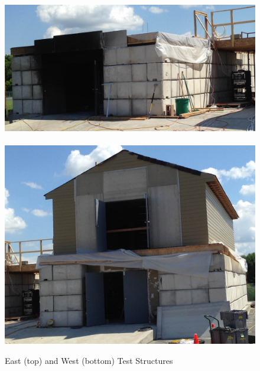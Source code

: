 \documentclass[12pt,oneside]{book}
\begin{document}
\begin{figure}[!ht]
\includegraphics[width=6in]{../../Figures/east_structure}
\\~\\
\includegraphics[width=6in]{../../Figures/west_structure}
\caption[East and West Test Structures]{East (top) and West (bottom) Test Structures}
\label{fig:struct_pics}
\end{figure}

\clearpage
\end{document}
